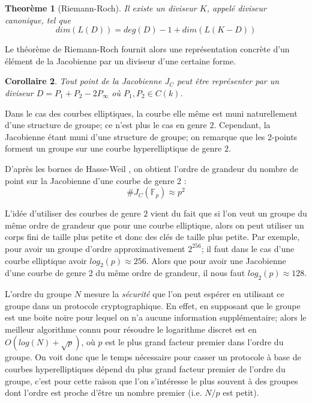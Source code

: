 \documentclass[a4paper]{article}
\newtheorem{theoreme}{Theorème}[section]
\newtheorem{corollaire}[theoreme]{Corollaire}
\theoremstyle{definition}
\theoremstyle{remark}
\numberwithin{equation}{section}
\begin{document}
\begin{theoreme}[Riemann-Roch]
Il existe un diviseur $K$, appelé diviseur canonique, tel que
$$dim (L(D)) = deg(D) - 1 + dim (L(K - D))$$
\end{theoreme}

Le théorème de Riemann-Roch fournit alors une représentation concrète d'un élément de la Jacobienne par un diviseur d'une certaine forme. 

\begin{corollaire}
\label{div_red}
Tout point de la Jacobienne $J_C$ peut être représenter par un diviseur $D = P_1 + P_2 - 2P_\infty$ où $P_1,P_2 \in C(k)$.
\end{corollaire}

Dans le cas des courbes elliptiques, la courbe elle même est muni naturellement d'une structure de groupe; ce n'est plus le cas en genre $2$. Cependant, la Jacobienne étant muni d'une structure de groupe; on remarque que les 2-points forment un groupe sur une courbe hyperelliptique de genre $2$.

D'après les bornes de Hasse-Weil \citep{weil}, on obtient l'ordre de grandeur du nombre de point sur la Jacobienne d'une courbe de genre 2 :
$$\#J_C(\mathbb{F}_p) \approx p^2$$

L'idée d'utiliser des courbes de genre $2$ vient du fait que si l'on veut un groupe du même ordre de grandeur que pour une courbe elliptique, alors on peut utiliser un corps fini de taille plus petite et donc des clés de taille plus petite. Par exemple, pour avoir un groupe d'ordre approximativement $2^{256}$; il faut dans le cas d'une courbe elliptique avoir $log_2(p) \approx 256$. Alors que pour avoir une Jacobienne d'une courbe de genre 2 du même ordre de grandeur, il nous faut $log_2(p) \approx 128$.

L'ordre du groupe $N$ mesure la \emph{sécurité} que l'on peut espérer en utilisant ce groupe dans un protocole cryptographique. En effet, en supposant que le groupe est une boite noire pour lequel on n'a aucune information supplémentaire; alors le meilleur algorithme connu pour résoudre le logarithme discret est en $O(log(N)+\sqrt{p})$, où $p$ est le plus grand facteur premier dans l'ordre du groupe. On voit donc que le temps nécessaire pour casser un protocole à base de courbes hyperelliptiques dépend du plus grand facteur premier de l'ordre du groupe, c'est pour cette raison que l'on s'intéresse le plus souvent à des groupes dont l'ordre est proche d'être un nombre premier (i.e. $N/p$ est petit).
 
\end{document}
